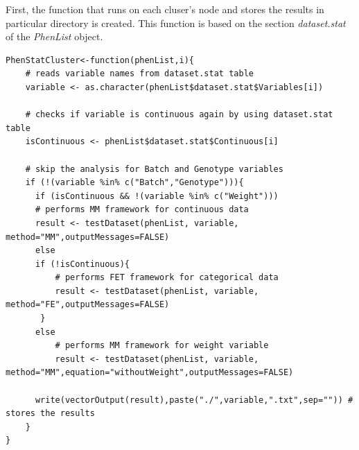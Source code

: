 \documentclass[12pt,a4paper]{article}
\begin{document}
First, the function that runs on each cluser's node and stores the results in particular directory is created. This function is based on the section \textit{dataset.stat} of the \textit{PhenList} object. 
\begingroup
\fontsize{8pt}{12pt}\selectfont
\begin{verbatim}
PhenStatCluster<-function(phenList,i){
    # reads variable names from dataset.stat table
    variable <- as.character(phenList$dataset.stat$Variables[i]) 
    
    # checks if variable is continuous again by using dataset.stat table
    isContinuous <- phenList$dataset.stat$Continuous[i]	
    
    # skip the analysis for Batch and Genotype variables
    if (!(variable %in% c("Batch","Genotype"))){	
      if (isContinuous && !(variable %in% c("Weight"))) 
	  # performs MM framework for continuous data
	  result <- testDataset(phenList, variable, method="MM",outputMessages=FALSE)	 
      else
	  if (!isContinuous){
	      # performs FET framework for categorical data
	      result <- testDataset(phenList, variable, method="FE",outputMessages=FALSE)	
	   }
	  else
	      # performs MM framework for weight variable
	      result <- testDataset(phenList, variable, method="MM",equation="withoutWeight",outputMessages=FALSE) 
	      
      write(vectorOutput(result),paste("./",variable,".txt",sep="")) # stores the results
    }
}
\end{verbatim}
\endgroup
\end{document}
